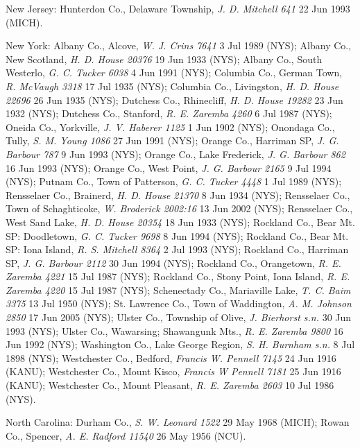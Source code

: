 \documentclass{article}
\begin{document}
New Jersey:
Hunterdon Co., Delaware Township, \textit{J. D. Mitchell 641} 22 Jun 1993 (MICH). 

New York:
Albany Co., Alcove, \textit{W. J. Crins 7641} 3 Jul 1989 (NYS); 
Albany Co., New Scotland, \textit{H. D. House 20376} 19 Jun 1933 (NYS); 
Albany Co., South Westerlo, \textit{G. C. Tucker 6038} 4 Jun 1991 (NYS); 
Columbia Co., German Town, \textit{R. McVaugh 3318} 17 Jul 1935 (NYS); 
Columbia Co., Livingston, \textit{H. D. House 22696} 26 Jun 1935 (NYS); 
Dutchess Co., Rhinecliff, \textit{H. D. House 19282} 23 Jun 1932 (NYS); 
Dutchess Co., Stanford, \textit{R. E. Zaremba 4260} 6 Jul 1987 (NYS); 
Oneida Co., Yorkville, \textit{J. V. Haberer 1125} 1 Jun 1902 (NYS); 
Onondaga Co., Tully, \textit{S. M. Young 1086} 27 Jun 1991 (NYS); 
Orange Co., Harriman SP, \textit{J. G. Barbour 787} 9 Jun 1993 (NYS); 
Orange Co., Lake Frederick, \textit{J. G. Barbour 862} 16 Jun 1993 (NYS); 
Orange Co., West Point, \textit{J. G. Barbour 2165} 9 Jul 1994 (NYS); 
Putnam Co., Town of Patterson, \textit{G. C. Tucker 4448} 1 Jul 1989 (NYS); 
Rensselaer Co., Brainerd, \textit{H. D. House 21370} 8 Jun 1934 (NYS); 
Rensselaer Co., Town of Schaghticoke, \textit{W. Broderick 2002:16} 13 Jun 2002 (NYS); 
Rensselaer Co., West Sand Lake, \textit{H. D. House 20354} 18 Jun 1933 (NYS); 
Rockland Co., Bear Mt. SP: Doodletown, \textit{G. C. Tucker 9698} 8 Jun 1994 (NYS); 
Rockland Co., Bear Mt. SP: Iona Island, \textit{R. S. Mitchell 8364} 2 Jul 1993 (NYS); 
Rockland Co., Harriman SP, \textit{J. G. Barbour 2112} 30 Jun 1994 (NYS); 
Rockland Co., Orangetown, \textit{R. E. Zaremba 4221} 15 Jul 1987 (NYS); 
Rockland Co., Stony Point, Iona Island, \textit{R. E. Zaremba 4220} 15 Jul 1987 (NYS); 
Schenectady Co., Mariaville Lake, \textit{T. C. Baim 3375} 13 Jul 1950 (NYS); 
St. Lawrence Co., Town of Waddington, \textit{A. M. Johnson 2850} 17 Jun 2005 (NYS); 
Ulster Co., Township of Olive, \textit{J. Bierhorst s.n.} 30 Jun 1993 (NYS); 
Ulster Co., Wawarsing; Shawangunk Mts., \textit{R. E. Zaremba 9800} 16 Jun 1992 (NYS); 
Washington Co., Lake George Region, \textit{S. H. Burnham s.n.} 8 Jul 1898 (NYS); 
Westchester Co., Bedford, \textit{Francis W. Pennell 7145} 24 Jun 1916 (KANU); 
Westchester Co., Mount Kisco, \textit{Francis W Pennell 7181} 25 Jun 1916 (KANU); 
Westchester Co., Mount Pleasant, \textit{R. E. Zaremba 2603} 10 Jul 1986 (NYS). 

North Carolina:
Durham Co., \textit{S. W. Leonard 1522} 29 May 1968 (MICH); 
Rowan Co., Spencer, \textit{A. E. Radford 11540} 26 May 1956 (NCU). 
\end{document}
